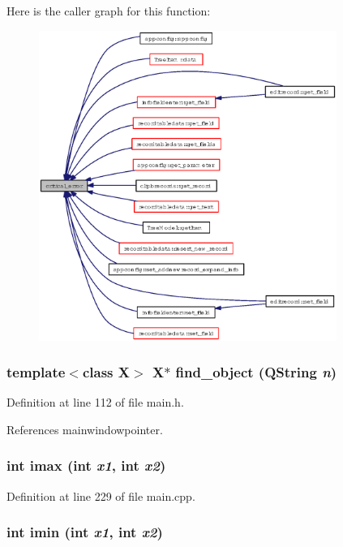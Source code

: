 Here is the caller graph for this function:\begin{figure}[H]
\begin{center}
\leavevmode
\includegraphics[width=275pt]{main_8h_fe5e42a76086b3d9d2912f0c17ef0e59_icgraph}
\end{center}
\end{figure}
\subsubsection{\setlength{\rightskip}{0pt plus 5cm}template$<$class X$>$ X$\ast$ find\_\-object (QString {\em n})\hspace{0.3cm}{\tt  [inline]}}\label{main_8h_cf7faff64ef33261f53a1cb145cc92c3}




Definition at line 112 of file main.h.

References mainwindowpointer.
\subsubsection{\setlength{\rightskip}{0pt plus 5cm}int imax (int {\em x1}, int {\em x2})}\label{main_8h_99d8888037c7927cbe6362f80a2f6f8b}




Definition at line 229 of file main.cpp.
\subsubsection{\setlength{\rightskip}{0pt plus 5cm}int imin (int {\em x1}, int {\em x2})}\label{main_8h_6c9ac00d126f1109a583b5264a07412a}





